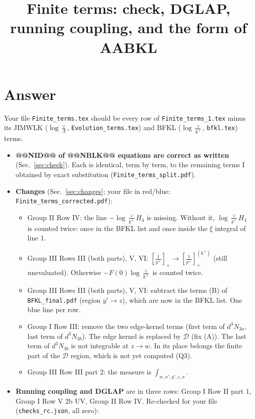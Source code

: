 \documentclass[9pt]{article}
\title{Finite terms: check, DGLAP, running coupling, and the form of AABKL}
\author{}
\date{}
\numberwithin{equation}{section}
\begin{document}
\maketitle
\sloppy

\section{Answer}\label{sec:answer}
Your file \texttt{Finite\_terms.tex} should be every row of \texttt{Finite\_terms\_1.tex} minus its JIMWLK ($\log\frac{\vee}{\Lambda}$, \texttt{Evolution\_terms.tex}) and BFKL ($\log\frac{\vee}{k^+}$, \texttt{bfkl.tex}) terms.
\begin{itemize}
\item \textbf{@@NID@@ of @@NBLK@@ equations are correct as written} (Sec.~\ref{sec:check}). Each is identical, term by term, to the remaining terms I obtained by exact substitution (\texttt{Finite\_terms\_split.pdf}).
\item \textbf{Changes} (Sec.~\ref{sec:changes}; your file in red/blue: \texttt{Finite\_terms\_corrected.pdf}):
\begin{itemize}
\item[C1] Group II Row IV: the line $-\log\frac{\vee}{k^+}H_4$ is missing. Without it, $\log\frac{\vee}{k^+}H_4$ is counted twice: once in the BFKL list and once inside the $\xi$ integral of line 1.
\item[C2] Group III Rows III (both parts), V, VI: $\left[\frac{1}{p^+}\right]_+\to\left[\frac{1}{p^+}\right]_+^{(k^+)}$ (still unevaluated). Otherwise $-F(0)\log\frac{\vee}{k^+}$ is counted twice.
\item[C3] Group III Rows III (both parts), V, VI: subtract the terms (B) of \texttt{BFKL\_final.pdf} (region $y'\to z$), which are now in the BFKL list. One blue line per row.
\item[C4] Group I Row III: remove the two edge-kernel terms (first term of $d^3N_{3a}$, last term of $d^3N_{3b}$). The edge kernel is replaced by $\mathcal D$ (fix (A)). The last term of $d^3N_{3b}$ is not integrable at $z\to w$. In its place belongs the finite part of the $\mathcal D$ region, which is not yet computed (Q3).
\item[C5] Group III Row III part 2: the measure is $\int_{w,x',y',z,x}$.
\end{itemize}
\item \textbf{Running coupling and DGLAP} are in three rows: Group I Row II part 1, Group I Row V 2b UV, Group II Row IV. Re-checked for your file (\texttt{checks\_rc.json}, all zero):

\end{itemize}
\end{document}
